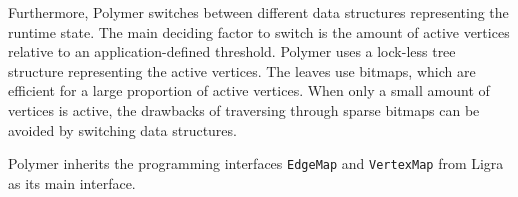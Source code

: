 Furthermore, Polymer switches between different data structures representing the runtime state. The main deciding factor to switch is the amount of active vertices relative to an application-defined threshold. Polymer uses a lock-less tree structure representing the active vertices. The leaves use bitmaps, which are efficient for a large proportion of active vertices. When only a small amount of vertices is active, the drawbacks of traversing through sparse bitmaps can be avoided by switching data structures.

Polymer inherits the programming interfaces \texttt{EdgeMap} and \texttt{VertexMap} from Ligra as its main interface.
